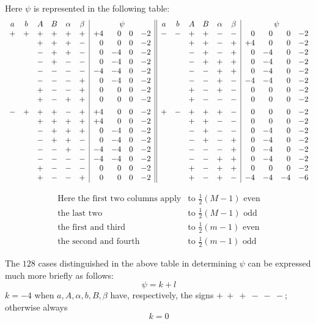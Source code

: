 Here $\psi$ is represented in the following table:
\begingroup\small\setlength{\arraycolsep}{1.8pt}
\[
\begin{array}{cccccc|rrrr||cccccc|rrrr}
a&b&A&B&\alpha&\beta&\multicolumn{4}{c||}{\psi}&a&b&A&B&\alpha&\beta&\multicolumn{4}{c}{\psi}\\
+&+&+&+&+&+&+4&0&0&-2&-&-&+&+&-&-&0&0&0&-2\\
&&+&+&+&-&0&0&0&-2&&&+&+&-&+&+4&0&0&-2\\
&&-&+&+&-&0&-4&0&-2&&&-&+&-&+&0&-4&0&-2\\
&&-&+&-&-&0&-4&0&-2&&&-&+&+&+&0&-4&0&-2\\
&&-&-&-&-&-4&-4&0&-2&&&-&-&+&+&0&-4&0&-2\\
&&-&-&-&+&0&-4&0&-2&&&-&-&+&-&-4&-4&0&-2\\
&&+&-&-&+&0&0&0&-2&&&+&-&+&-&0&0&0&-2\\
&&+&-&+&+&0&0&0&-2&&&+&-&-&-&0&0&0&-2\\[4pt]
-&+&+&+&-&+&+4&0&0&-2&+&-&+&+&+&-&0&0&0&-2\\
&&+&+&+&+&+4&0&0&-2&&&+&+&-&-&0&0&0&-2\\
&&-&+&+&+&0&-4&0&-2&&&-&+&-&-&0&-4&0&-2\\
&&-&+&+&-&0&-4&0&-2&&&-&+&-&+&0&-4&0&-2\\
&&-&-&+&-&-4&-4&0&-2&&&-&-&-&+&0&-4&0&-2\\
&&-&-&-&-&-4&-4&0&-2&&&-&-&+&+&0&-4&0&-2\\
&&+&-&-&-&0&0&0&-2&&&+&-&+&+&0&0&0&-2\\
&&+&-&-&+&0&0&0&-2&&&+&-&+&-&-4&-4&-4&-6\\
\end{array}
\]
\endgroup

\[
\begin{array}{lll}
\text{Here the first two columns apply}&\text{to }\frac12(M-1)\text{ even}\\
\text{the last two}&\text{to }\frac12(M-1)\text{ odd}\\
\text{the first and third}&\text{to }\frac12(m-1)\text{ even}\\
\text{the second and fourth}&\text{to }\frac12(m-1)\text{ odd}
\end{array}
\]

\clearpage
{}
The $128$ cases distinguished in the above table in determining $\psi$ can be expressed much more briefly as follows:
\[
\psi=k+l
\]
$k=-4$ when $a,A,\alpha,b,B,\beta$ have, respectively, the signs $+\ +\ +\ -\ -\ -$; otherwise always
\[
k=0
\]

